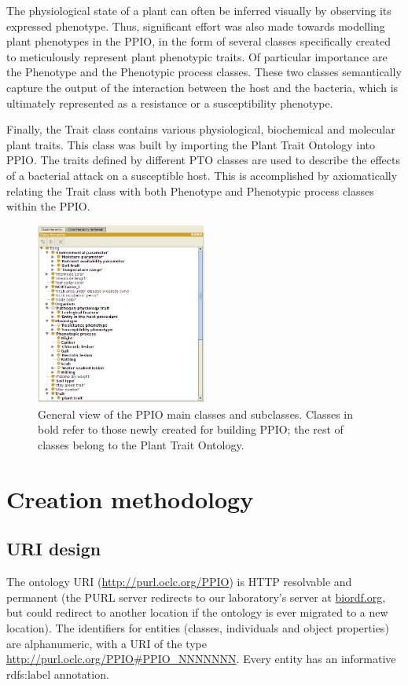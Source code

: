 \documentclass[sw]{iosart2c}
\newcommand{\myurl}[1]{\footnote{\url{#1}}}
\begin{document}
The physiological state of a plant can often be inferred visually by observing its expressed phenotype. Thus, significant effort was also made towards modelling plant phenotypes in the PPIO, in the form of several classes specifically created to meticulously represent plant phenotypic traits. Of particular importance are the {\sf Phenotype} and the {\sf Phenotypic process} classes. These two classes semantically capture the output of the interaction between the host and the bacteria, which is ultimately represented as a resistance or a susceptibility phenotype.

Finally, the {\sf Trait} class contains various physiological, biochemical and molecular plant traits. This class was built by importing the Plant Trait Ontology
\cite{PTO} into PPIO. The traits defined by different PTO classes are used to describe the effects of a bacterial attack on a susceptible host. This is accomplished by axiomatically relating the {\sf Trait} class with both {\sf Phenotype} and {\sf Phenotypic process} classes within the PPIO.


\begin{figure}
\includegraphics[width=0.5\textwidth]{PPIO-classes2.png}
\caption{General view of the PPIO main classes and subclasses. Classes in bold refer to those newly created for building PPIO; the rest of classes belong to the Plant Trait Ontology.}\label{fig:ppio-classes}
\end{figure}


\section{Creation methodology}

\subsection{URI design}
The ontology URI (\url{http://purl.oclc.org/PPIO}) is HTTP resolvable and permanent (the PURL server redirects to our laboratory's server at \url{biordf.org}, but could redirect to another location if the ontology is ever migrated to a new location). The identifiers for entities (classes, individuals and object properties) are alphanumeric, with a URI of the type \url{http://purl.oclc.org/PPIO#PPIO_NNNNNNN}. Every entity has an informative {\sf rdfs:label} annotation. 
\end{document}
